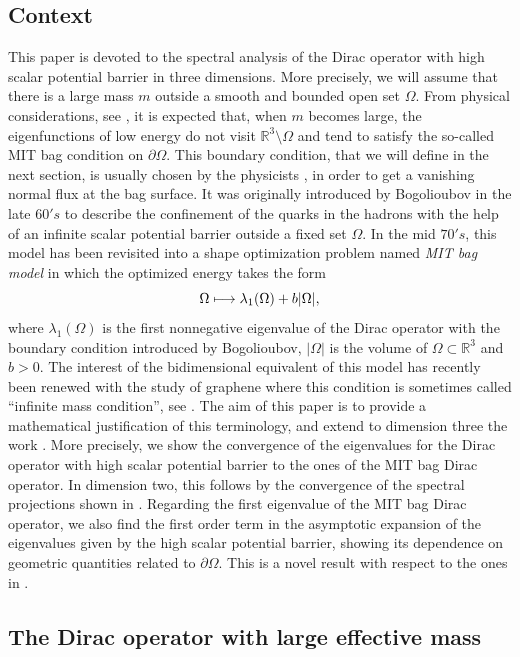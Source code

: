 \documentclass[JEP,XML,SOM,Unicode]{cedram}
\newcommand\mto{\mathchoice{\longmapsto}{\mapsto}{\mapsto}{\mapsto}}
\theoremstyle{plain}
\theoremstyle{definition}
\newcommand{\RR}{\mathbb{R}}
\begin{document}
\subsection{Context}
This paper is devoted to the spectral analysis of the Dirac operator with high scalar potential barrier in three dimensions. More precisely, we will assume that there is a large mass $m$ outside a smooth and bounded open set $\Omega$. From physical considerations, see \cite{bogoliubov1987,MIT061974}, it is expected that, when $m$ becomes large, the eigenfunctions of low energy do not visit $\RR^3\setminus\Omega$ and tend to satisfy the so-called MIT bag condition on $\partial\Omega$. This boundary condition, that we will define in the next section, is usually chosen by the physicists \cite{johnson,MIT061974,PhysRevD.12.2060}, in order to get a vanishing normal flux at the bag surface. It was originally introduced by Bogolioubov in the late $60's$ \cite{bogoliubov1987} to describe the confinement of the quarks in the hadrons with the help of an infinite scalar potential barrier outside a fixed set $\Omega$. In the mid $70's$, this model has been revisited into a shape optimization problem named \emph{MIT bag model} \cite{johnson,MIT061974,PhysRevD.12.2060} in which the optimized energy takes the form
\[
\Omega\mto \lambda_1(\Omega) + b|\Omega|,
\]
where $\lambda_1(\Omega)$ is the first nonnegative eigenvalue of the Dirac operator with the boundary condition introduced by Bogolioubov, $|\Omega|$ is the volume of $\Omega\subset\RR^3$ and $b>0$.
The interest of the bidimensional equivalent of this model has recently been renewed with the study of graphene where this condition is sometimes called \enquote{infinite mass condition}, see \cite{PhysRevB.77.085423,MR901725}. The aim of this paper is to provide a mathematical justification of this terminology, and extend to dimension three the work \cite{stockmeyer2016infinite}.
More precisely, we show the convergence of the eigenvalues for the Dirac operator with high scalar potential barrier to the ones of the MIT bag Dirac operator. In dimension two, this follows by the convergence of the spectral projections shown in \cite{stockmeyer2016infinite}. Regarding the first eigenvalue of the MIT bag Dirac operator, we also find the first order term in the asymptotic expansion of the eigenvalues given by the high scalar potential barrier, showing its dependence on geometric quantities related to $\partial\Omega$. This is a novel result with respect to the ones in \cite{stockmeyer2016infinite}.

\subsection{The Dirac operator with large effective mass}
\end{document}
